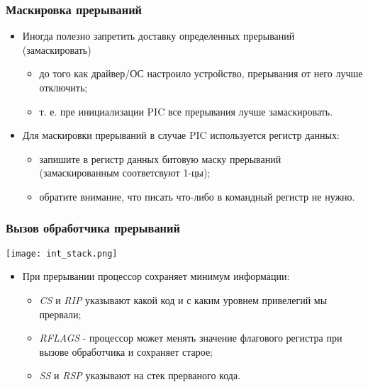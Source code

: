 \begin{frame}
\frametitle{Маскировка прерываний}
\begin{itemize}
  \item Иногда полезно запретить доставку определенных прерываний
  (замаскировать)
  \begin{itemize}
    \item до того как драйвер/ОС настроило устройство, прерывания от него лучше
    отключить;
    \item т. е. пре инициализации PIC все прерывания лучше замаскировать.
  \end{itemize}
  \item Для маскировки прерываний в случае PIC используется регистр данных:
  \begin{itemize}
    \item запишите в регистр данных битовую маску прерываний (замаскированным
    соответсвуют 1-цы);
    \item обратите внимание, что писать что-либо в командный регистр не нужно.
  \end{itemize}
\end{itemize}
\end{frame}

\begin{frame}
\frametitle{Вызов обработчика прерываний}
\begin{center}
  \texttt{[image: int\_stack.png]}
\end{center}
\begin{itemize}
  \item При прерывании процессор сохраняет минимум информации:
  \begin{itemize}
    \item \emph{CS} и \emph{RIP} указывают какой код и с каким уровнем
    привелегий мы прервали;
    \item \emph{RFLAGS} - процессор может менять значение флагового регистра при
    вызове обработчика и сохраняет старое;
    \item \emph{SS} и \emph{RSP} указывают на стек прерваного кода.
  \end{itemize}
\end{itemize}
\end{frame}

